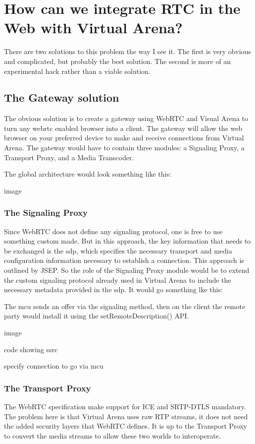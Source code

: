 
\section{How can we integrate RTC in the Web with Virtual Arena?}
There are two solutions to this problem the way I see it. The first is very obvious and complicated, but probably the best solution. The second is more of an experimental hack rather than a viable solution.

\subsection{The Gateway solution}
The obvious solution is to create a gateway using WebRTC and Visual Arena to turn any webrtc enabled browser into a client. The gateway will allow the web browser on your preferred device to make and receive connections from Virtual Arena. The gateway would have to contain three modules:
a Signaling Proxy, a Transport Proxy, and a Media Transcoder.

The global architecture would look something like this:

image

\subsubsection{The Signaling Proxy}
Since WebRTC does not define any signaling protocol, one is free to use something custom made. But in this approach, the key information that needs to be exchanged is the \gls{sdp}, which specifies the necessary transport and media configuration information necessary to establish a connection. This approach is outlined by \gls{JSEP}. So the role of the Signaling Proxy module would be to extend the custom signaling protocol already used in Virtual Arena to include the necessary metadata provided in the \gls{sdp}. It would go something lke this:

The \gls{mcu} sends an offer via the signaling method, then on the client the remote party would install it using the setRemoteDescription() API.

image

code showing ssrc

specify connection to go via mcu

\subsubsection{The Transport Proxy}
The WebRTC specification make support for ICE and SRTP-DTLS mandatory. The problem here is that Virtual Arena uses raw RTP streams, it does not need the added security layers that WebRTC defines. It is up to the Transport Proxy to convert the media streams to allow these two worlds to interoperate. 

